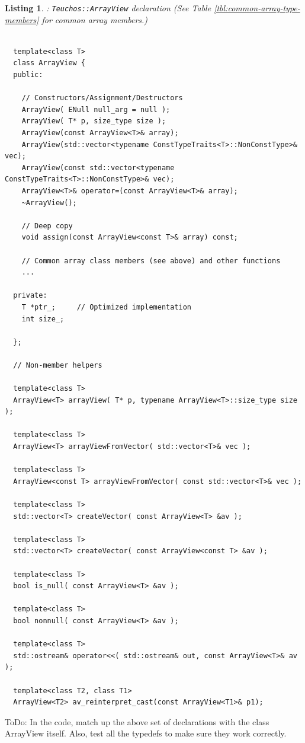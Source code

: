 \documentclass[pdf,ps2pdf,11pt]{SANDreport}
\newtheorem{listing}{Listing}
\begin{document}
{}\begin{listing}: {}\texttt{Teuchos::ArrayView} declaration (See
Table {}\ref{tbl:common-array-type-members} for common array members.)
\label{listing:ArrayView}
{\small\begin{verbatim}

  template<class T>
  class ArrayView {
  public:

    // Constructors/Assignment/Destructors
    ArrayView( ENull null_arg = null );
    ArrayView( T* p, size_type size );
    ArrayView(const ArrayView<T>& array);
    ArrayView(std::vector<typename ConstTypeTraits<T>::NonConstType>& vec);
    ArrayView(const std::vector<typename ConstTypeTraits<T>::NonConstType>& vec);
    ArrayView<T>& operator=(const ArrayView<T>& array);
    ~ArrayView();

    // Deep copy  
    void assign(const ArrayView<const T>& array) const;

    // Common array class members (see above) and other functions
    ...

  private:
    T *ptr_;     // Optimized implementation
    int size_;

  };

  // Non-member helpers

  template<class T>
  ArrayView<T> arrayView( T* p, typename ArrayView<T>::size_type size );

  template<class T>
  ArrayView<T> arrayViewFromVector( std::vector<T>& vec );

  template<class T>
  ArrayView<const T> arrayViewFromVector( const std::vector<T>& vec );

  template<class T>
  std::vector<T> createVector( const ArrayView<T> &av );

  template<class T>
  std::vector<T> createVector( const ArrayView<const T> &av );

  template<class T>
  bool is_null( const ArrayView<T> &av );

  template<class T>
  bool nonnull( const ArrayView<T> &av );

  template<class T>
  std::ostream& operator<<( std::ostream& out, const ArrayView<T>& av );

  template<class T2, class T1>
  ArrayView<T2> av_reinterpret_cast(const ArrayView<T1>& p1);

\end{verbatim}}
\end{listing}

ToDo: In the code, match up the above set of declarations with the
class ArrayView itself.  Also, test all the typedefs to make sure they
work correctly.
\end{document}
